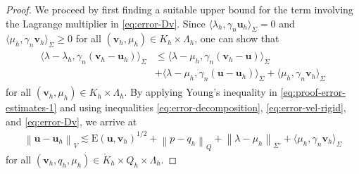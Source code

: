 \documentclass[onefignum,onetabnum]{siamart190516}
\newcommand{\bu}{\boldsymbol{u}}
\newcommand{\bv}{\boldsymbol{v}}
\newcommand{\bE}{\mathrm{E}}
\newcommand{\nrm}[1]{\left\lVert#1\right\rVert}
\newcommand{\Ko}{\mathring{K}}
\begin{document}
\begin{proof}
	We proceed by first finding a suitable upper bound for the term involving the Lagrange multiplier in \eqref{eq:error-Dv}. Since $\langle \lambda_h,\gamma_n\bu_h\rangle_\Sigma = 0$ and $\langle \mu_h,\gamma_n\bv_h\rangle_\Sigma\geq 0$ for all $(\bv_h,\mu_h)\in K_h\times \Lambda_h$, one can show that
	\begin{align}\label{eq:proof-error-estimates-1}
		\begin{split}
			\langle \lambda - \lambda_h, \gamma_n(\bv_h - \bu_h)\rangle_\Sigma & \leq \langle \lambda - \mu_h, \gamma_n (\bv_h - \bu) \rangle_\Sigma \\
			&+ \langle \lambda - \mu_h, \gamma_n (\bu - \bu_h) \rangle_\Sigma + \langle \mu_h, \gamma_n\bv_h \rangle_\Sigma
		\end{split}
	\end{align}
	for all $(\bv_h,\mu_h)\in K_h\times \Lambda_h$. By applying Young's inequality in \eqref{eq:proof-error-estimates-1} and using inequalities \eqref{eq:error-decomposition}, \eqref{eq:error-vel-rigid}, and \eqref{eq:error-Dv}, we arrive at 
	\begin{align}\label{eq:proof-error-estimates-2}
		\nrm{\bu - \bu_h}_V \lesssim \bE(\bu,\bv_h)^{1/2} + \nrm{p - q_h}_Q + \nrm{\lambda - \mu_h}_{\Sigma'} + \langle \mu_h, \gamma_n\bv_h \rangle_\Sigma
	\end{align}
	for all $(\bv_h,q_h,\mu_h)\in \Ko_h\times Q_h \times \Lambda_h$.
	

\end{proof}
\end{document}
